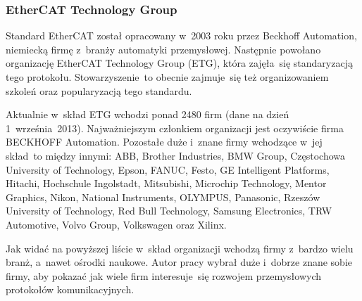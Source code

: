 \subsubsection{EtherCAT Technology Group}

Standard EtherCAT został opracowany w~2003 roku przez Beckhoff Automation, niemiecką firmę z~branży automatyki przemysłowej. Następnie powołano organizację EtherCAT Technology Group (ETG), która zajęła~się standaryzacją tego protokołu. Stowarzyszenie~to obecnie zajmuje~się też organizowaniem szkoleń oraz popularyzacją tego standardu. 

Aktualnie w~skład ETG wchodzi ponad 2480 firm (dane na dzień 1~września~2013). Najważniejszym członkiem organizacji jest oczywiście firma BECKHOFF Automation. Pozostałe duże i~znane firmy wchodzące w~jej skład~to między innymi: ABB, Brother Industries, BMW Group, Częstochowa University of Technology, Epson, FANUC, Festo, GE Intelligent Platforms, Hitachi, Hochschule Ingolstadt, Mitsubishi, Microchip Technology, Mentor Graphics, Nikon, National Instruments, OLYMPUS, Panasonic, Rzeszów University of Technology, Red Bull Technology, Samsung Electronics, TRW Automotive, Volvo Group, Volkswagen oraz Xilinx.

Jak widać na powyższej liście w~skład organizacji wchodzą firmy z~bardzo wielu branż, a~nawet ośrodki naukowe. Autor pracy wybrał duże i~dobrze znane sobie firmy, aby pokazać jak wiele firm interesuje~się rozwojem przemysłowych protokołów komunikacyjnych.